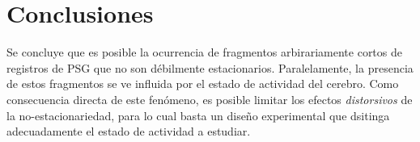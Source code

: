 %
%
%
%
%
%


\section{Conclusiones}

Se concluye que
es posible la ocurrencia de fragmentos arbirariamente cortos de registros de PSG que no 
son débilmente estacionarios. Paralelamente, la presencia de estos fragmentos se ve influida por el
estado de actividad del cerebro.
%
Como consecuencia directa de este fenómeno, es posible limitar los efectos \textit{distorsivos} de 
la no-estacionariedad, para lo cual basta un diseño experimental que dsitinga adecuadamente el
estado de actividad a estudiar. 

